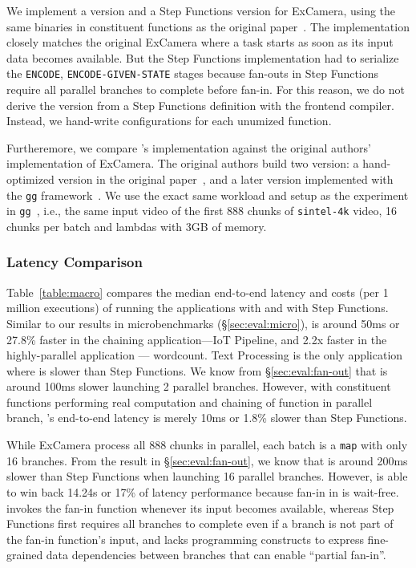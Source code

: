 \begin{itemize}
    We implement a \name{} version and a Step Functions version for ExCamera,
    using the same binaries in constituent functions as the original
    paper~\cite{excamera-binary}. The \name{} implementation closely matches
    the original ExCamera where a task starts as soon as its input data
    becomes available. But the Step Functions implementation had to serialize
    the \texttt{ENCODE}, \texttt{ENCODE-GIVEN-STATE} stages because fan-outs
    in Step Functions require all parallel branches to complete before fan-in.
    For this reason, we do not derive the \name{} version from a Step
    Functions definition with the frontend compiler. Instead, we hand-write
  \name{} configurations for each unumized function.

    Furtheremore, we compare \name{}'s implementation against the original
    authors' implementation of ExCamera. The original authors build two
    version: a hand-optimized version in the original paper~\cite{excamera},
    and a later version implemented with the \texttt{gg}
    framework~\cite{gg-atc}. We use the exact same workload and setup as the
    experiment in \texttt{gg}~\cite{gg-atc}, i.e., the same input video of the
    first 888 chunks of \texttt{sintel-4k} video, 16 chunks per batch and
    lambdas with 3GB of memory.

\end{itemize}

\subsubsection{Latency Comparison}

Table~\ref{table:macro} compares the median end-to-end latency and costs (per 1
million executions) of running the applications with \name{} and with Step
Functions. Similar to our results in microbenchmarks (\S\ref{sec:eval:micro}),
\name{} is around 50ms or 27.8\% faster in the chaining application---IoT
Pipeline, and 2.2x faster in the highly-parallel application --- wordcount.
Text Processing is the only application where \name{} is slower than Step
Functions. We know from \S\ref{sec:eval:fan-out} that \name{} is around 100ms
slower launching 2 parallel branches. However, with constituent  functions
performing real computation and chaining of function in parallel branch,
\name{}'s end-to-end latency is merely 10ms or 1.8\% slower than Step
Functions.

While ExCamera process all 888 chunks in parallel, each batch is a
\texttt{map} with only 16 branches. From the result in
\S\ref{sec:eval:fan-out}, we know that \name{} is around 200ms slower than
Step Functions when launching 16 parallel branches. However, \name{} is able
to win back 14.24s or 17\% of latency performance because fan-in in \name{} is
wait-free. \name{} invokes the fan-in function whenever its input becomes
available, whereas Step Functions first requires all branches to complete even
if a branch is not part of the fan-in function's input, and lacks programming
constructs to express fine-grained data dependencies between branches that can
enable ``partial fan-in''.

